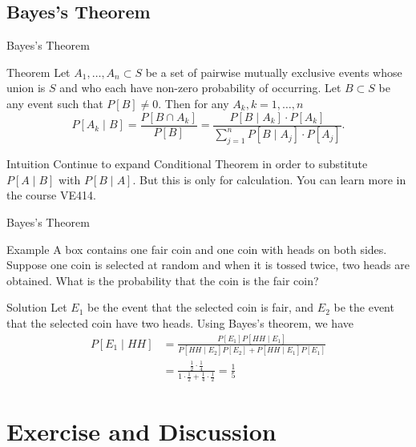 \documentclass{beamer}
\begin{document}
\subsection{Bayes's Theorem}
\begin{frame}{Bayes's Theorem}
\begin{block}{Theorem}
Let $A_{1}, \ldots, A_{n} \subset S$ be a set of pairwise mutually exclusive events whose union is $S$ and who each have non-zero probability of occurring. Let $B \subset S$ be any event such that $P[B] \neq 0$. Then for any $A_{k}, k=1, \ldots, n$
$$
P\left[A_{k} \mid B\right]=\frac{P\left[B \cap A_{k}\right]}{P[B]}=\frac{P\left[B \mid A_{k}\right] \cdot P\left[A_{k}\right]}{\sum_{j=1}^{n} P\left[B \mid A_{j}\right] \cdot P\left[A_{j}\right]}.
$$
\end{block}
\begin{block}{Intuition}
Continue to expand Conditional Theorem in order to substitute $P[A\mid B]$ with $P[B\mid A]$. But this is only for calculation. You can learn more in the course VE414.
\end{block}
\end{frame}

\begin{frame}{Bayes's Theorem}
\begin{block}{Example}
A box contains one fair coin and one coin with heads on both sides. Suppose one coin is selected at random and when it is tossed twice, two heads are obtained. What is the probability that the coin is the fair coin?
\end{block}
\pause
\begin{block}{Solution}
Let $E_{1}$ be the event that the selected coin is fair, and $E_{2}$ be the event that the selected coin have two heads. Using Bayes's theorem, we have
$$
\begin{aligned}
P\left[E_{1} \mid H H\right] &=\frac{P\left[E_{1}\right] P\left[H H \mid E_{1}\right]}{P\left[H H \mid E_{2}\right] P\left[E_{2}\right]+P\left[H H \mid E_{1}\right] P\left[E_{1}\right]} \\
&=\frac{\frac{1}{2} \cdot \frac{1}{4}}{1 \cdot \frac{1}{2}+\frac{1}{4} \cdot \frac{1}{2}}=\frac{1}{5}
\end{aligned}
$$
\end{block}
\end{frame}

\section{Exercise and Discussion}
\end{document}
